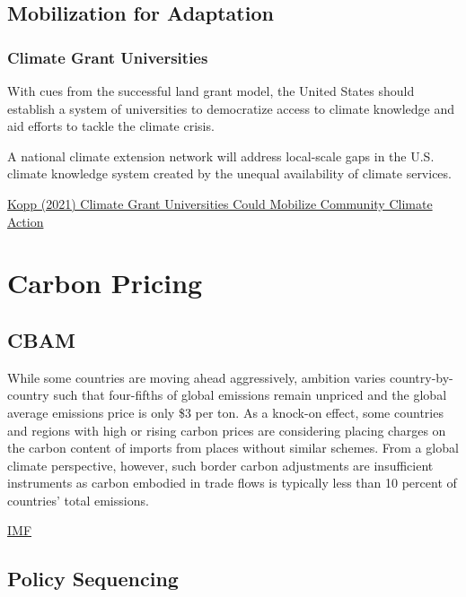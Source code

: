\documentclass[
]{book}
\begin{document}
\hypertarget{mobilization-for-adaptation}{%
\section{Mobilization for Adaptation}\label{mobilization-for-adaptation}}

\hypertarget{climate-grant-universities}{%
\subsection{Climate Grant Universities}\label{climate-grant-universities}}

With cues from the successful land grant model, the United States should establish a system of universities to democratize access to climate knowledge and aid efforts to tackle the climate crisis.

A national climate extension network will address local-scale gaps in the U.S. climate knowledge system created by the unequal availability of climate services.

\href{https://eos.org/opinions/climate-grant-universities-could-mobilize-community-climate-action}{Kopp (2021) Climate Grant Universities Could Mobilize Community Climate Action}

\hypertarget{carbon-pricing}{%
\chapter{Carbon Pricing}\label{carbon-pricing}}

\hypertarget{cbam}{%
\section{CBAM}\label{cbam}}

While some countries are moving ahead aggressively, ambition varies country-by-country such that four-fifths of global emissions remain unpriced and the global average emissions price is only \$3 per ton. As a knock-on effect, some countries and regions with high or rising carbon prices are considering placing charges on the carbon content of imports from places without similar schemes. From a global climate perspective, however, such border carbon adjustments are insufficient instruments as carbon embodied in trade flows is typically less than 10 percent of countries' total emissions.

\href{https://blogs.imf.org/2021/06/18/a-proposal-to-scale-up-global-carbon-pricing/}{IMF}

\hypertarget{policy-sequencing}{%
\section{Policy Sequencing}\label{policy-sequencing}}
\end{document}
